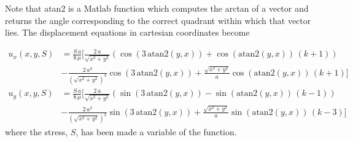 \documentclass[12pt,oneside,openany,a4paper, %
english, %
masters-t, goldenblock]{usthesis}
\begin{document}
\begin{appendices}


Note that atan2 is a Matlab function which computes the arctan of a vector and returns the angle corresponding to the correct quadrant within which that vector lies. The displacement equations in cartesian coordinates become

\begin{align}
  u_x(x,y,S) &= \frac{S\,a}{8\,\mu } \bigg[\frac{2\,a}{\sqrt{x^2+y^2}} \left(\cos\left(3\,\text{atan2}(y,x) \right)+\cos\left( \text{atan2}(y,x) \right)\,\left(k+1\right)\right) \nonumber \\ &-\frac{2\,a^3}{\left( \sqrt{x^2+y^2} \right) ^3} \cos\left(3\, \text{atan2}(y,x) \right)+\frac{\sqrt{x^2+y^2}}{a} \cos\left( \text{atan2}(y,x) \right)\,\left(k+1\right)  \bigg] \\
  u_y(x,y,S) &= \frac{S\,a}{8\,\mu } \bigg[\frac{2\,a}{\sqrt{x^2+y^2}} \left(\sin\left(3\, \text{atan2}(y,x) \right)-\sin\left( \text{atan2}(y,x) \right)\,\left(k-1\right)\right) \nonumber \\ &-\frac{2\,a^3}{ \left( \sqrt{x^2+y^2} \right)^3} \sin\left(3\, \text{atan2}(y,x) \right) +\frac{\sqrt{x^2+y^2}}{a} \sin\left( \text{atan2}(y,x) \right)\,\left(k-3\right)  \bigg]
\end{align}
where the stress, $S$, has been made a variable of the function.


\end{appendices}
\end{document}
